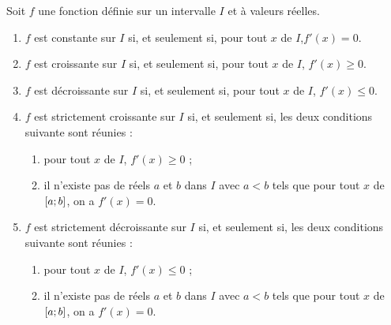 \begin{defprop}
	Soit \(f\) une fonction définie sur un intervalle \(I\) et à valeurs réelles. \\
	\begin{enumerate}
		\item \(f\) est constante sur \(I\) si, et seulement si, pour tout \(x\) de \(I\),\(f'(x)=0\).
		\item \(f\) est croissante sur \(I\) si, et seulement si, pour tout \(x\) de \(I\), \(f'(x) \geq 0\).
		\item \(f\) est décroissante sur \(I\) si, et seulement si, pour tout \(x\) de \(I\), \(f'(x) \leq 0\).
		\item \(f\) est strictement croissante sur \(I\) si, et seulement si, les deux conditions suivante sont réunies :
		      \begin{enumerate}
			      \item pour tout \(x\) de \(I\), \(f'(x) \geq 0\) ;
			      \item il n'existe pas de réels \(a\) et \(b\) dans \(I\) avec \(a < b\) tels que pour tout \(x\) de \(\left[a;b\right]\), on a \(f'(x) = 0\).
		      \end{enumerate}
		\item \(f\) est strictement décroissante sur \(I\) si, et seulement si, les deux conditions suivante sont réunies :
		      \begin{enumerate}
			      \item pour tout \(x\) de \(I\), \(f'(x) \leq 0\) ;
			      \item il n'existe pas de réels \(a\) et \(b\) dans \(I\) avec \(a < b\) tels que pour tout \(x\) de \(\left[a;b\right]\), on a \(f'(x) = 0\).
		      \end{enumerate}
	\end{enumerate}
\end{defprop}

